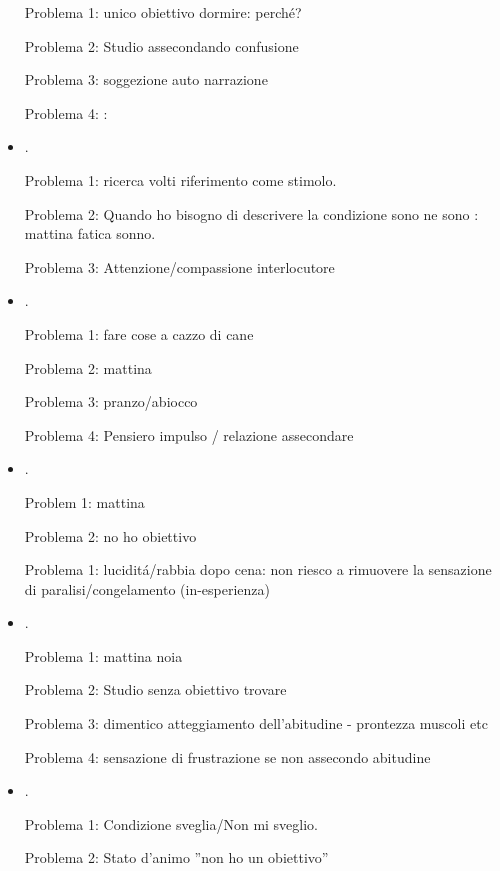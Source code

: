 \begin{itemize}
Problema 1: unico obiettivo dormire: perch\'e?

Problema 2: Studio assecondando confusione

Problema 3: soggezione auto narrazione 

Problema 4: : 

\item {}.

Problema 1: ricerca volti riferimento come stimolo.

Problema 2: Quando ho bisogno di descrivere la condizione sono ne sono  : mattina fatica sonno.

Problema 3: Attenzione/compassione interlocutore

\item {}.

Problema 1: fare cose a cazzo di cane

Problema 2: mattina

Problema 3: pranzo/abiocco

Problema 4: Pensiero impulso / relazione assecondare

\item {}.

Problem 1: mattina

Problema 2: no ho obiettivo

Problema 1: lucidit\'a/rabbia dopo cena: non riesco a rimuovere la sensazione di paralisi/congelamento (in-esperienza)

\item {}.

Problema 1: mattina noia

Problema 2: Studio senza obiettivo trovare

Problema 3: dimentico atteggiamento dell'abitudine - prontezza muscoli etc

Problema 4: sensazione di frustrazione se non assecondo abitudine

\item {}.

Problema 1: Condizione sveglia/Non mi sveglio.

Problema 2: Stato d'animo ''non ho un obiettivo''


\end{itemize}
